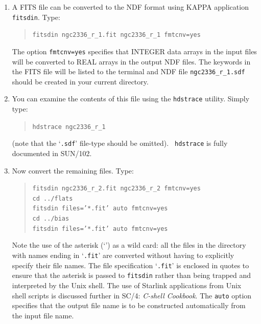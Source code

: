 \documentclass[twoside,11pt]{article}
\newcommand{\xref}[3]{#1}
\begin{document}
\begin{enumerate}
\begin{figure}[htbp]
  \begin{quote}
  \caption{The first few FITS header records for file {\tt ngc2336\_r\_1.fit}
  \label{FITSKEYS} }
  \end{quote}

  \end{figure}

  \item A FITS file can be converted to the NDF format using KAPPA
   application \xref{{\tt fitsdin}}{sun95}{FITSDIN}.  Type:

  \begin{quote}
   {\tt fitsdin ngc2336\_r\_1.fit ngc2336\_r\_1 fmtcnv=yes}
  \end{quote}

   The option {\tt fmtcnv=yes} specifies that INTEGER data arrays in the
   input files will be converted to REAL arrays in the output NDF files.
   The keywords in the FITS file will be listed to the terminal and NDF
   file {\tt ngc2336\_r\_1.sdf} should be created in your current
   directory.

  \item You can examine the contents of this file using the {\tt hdstrace}
   utility.  Simply type:

  \begin{quote}
   {\tt hdstrace ngc2336\_r\_1}
  \end{quote}

   (note that the `{\tt .sdf}' file-type should be omitted).  {\tt
   hdstrace} is fully documented in \xref{SUN/102}{sun102}{}\/\cite{SUN102}.

  \item Now convert the remaining files.  Type:

  \begin{quote}
   {\tt fitsdin ngc2336\_r\_2.fit ngc2336\_r\_2 fmtcnv=yes  \\
   cd ../flats  \\
   fitsdin files='*.fit' auto fmtcnv=yes  \\
   cd ../bias   \\
   fitsdin files='*.fit' auto fmtcnv=yes}
  \end{quote}

   Note the use of the asterisk (`{\tt *}') as a wild card: all the files
   in the directory with names ending in `{\tt .fit}' are converted without
   having to explicitly specify their file names.  The file specification
   `{\tt *.fit}' is enclosed in quotes to ensure that the asterisk is
   passed to {\tt fitsdin} rather than being trapped and interpreted by the
   Unix shell.  The use of Starlink applications from Unix shell scripts is
   discussed further in \xref{SC/4:
   {\it C-shell Cookbook}\/}{sc4}{}\cite{SC4}.  The {\tt auto} option
   specifies that the output file name is to be constructed automatically
   from the input file name.

\end{enumerate}
\end{document}

